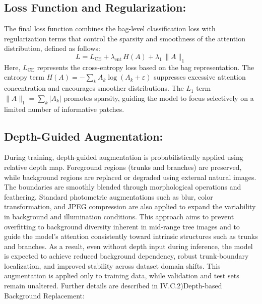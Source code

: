 \documentclass{article}
\begin{document}
\subsection{Loss Function and Regularization:}
The final loss function combines the bag-level classification loss with regularization terms that control the sparsity and smoothness of the attention distribution, defined as follows:
\begin{equation}\tag{10}
L=L_{\mathrm{CE}}+\lambda_{\mathrm{ent}}\, H(A)+\lambda_{1}\,\|A\|_{1}
\end{equation}
Here, $L_{\mathrm{CE}}$ represents the cross-entropy loss based on the bag representation. 
The entropy term $H(A)=-\sum_k A_k \log(A_k+\varepsilon)$ suppresses excessive attention concentration and encourages smoother distributions. The $L_1$ term $\|A\|_1=\sum_k |A_k|$ promotes sparsity, guiding the model to focus selectively on a limited number of informative patches.

\subsection{Depth-Guided Augmentation:}
During training, depth-guided augmentation is probabilistically applied using relative depth map. Foreground regions (trunks and branches) are preserved, while background regions are replaced or degraded using external natural images. The boundaries are smoothly blended through morphological operations and feathering. Standard photometric augmentations such as blur, color transformation, and JPEG compression are also applied to expand the variability in background and illumination conditions. This approach aims to prevent overfitting to background diversity inherent in mid-range tree images and to guide the model’s attention consistently toward intrinsic structures such as trunks and branches. As a result, even without depth input during inference, the model is expected to achieve reduced background dependency, robust trunk-boundary localization, and improved stability across dataset domain shifts. This augmentation is applied only to training data, while validation and test sets remain unaltered. Further details are described in IV.C.2)Depth-based Background Replacement:
\end{document}
